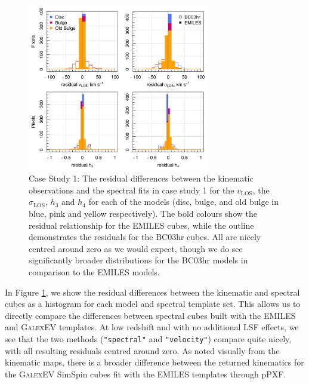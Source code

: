 \documentclass[
  journal=pasa,
  manuscript=research-paper, %
  year=2020,
  volume=37,
]{cup-journal}
\begin{document}
\begin{figure}
    \centering
    \includegraphics[keepaspectratio, width=8cm]{Figures/cs1_histograms.jpeg}
    \caption{Case Study 1: The residual differences between the kinematic observations and the spectral fits in case study 1 for the $v_{\text{LOS}}$, the $\sigma_{\text{LOS}}$, $h_3$ and $h_4$ for each of the models (disc, bulge, and old bulge in blue, pink and yellow respectively). The bold colours show the residual relationship for the EMILES cubes, while the outline demonstrates the residuals for the BC03hr cubes. All are nicely centred around zero as we would expect, though we do see significantly broader distributions for the BC03hr models in comparison to the EMILES models.}
    \label{fig:cs1_hist}
\end{figure}

In Figure \ref{fig:cs1_hist}, we show the residual differences between the kinematic and spectral cubes as a histogram for each model and spectral template set. 
This allows us to directly compare the differences between spectral cubes built with the EMILES and \textsc{GalexEV} templates.
At low redshift and with no additional LSF effects, we see that the two methods (\texttt{"spectral"} and \texttt{"velocity"}) compare quite nicely, with all resulting residuals centred around zero.
As noted visually from the kinematic maps, there is a broader difference between the returned kinematics for the \textsc{GalexEV} SimSpin cubes fit with the EMILES templates through pPXF.


\end{document}
